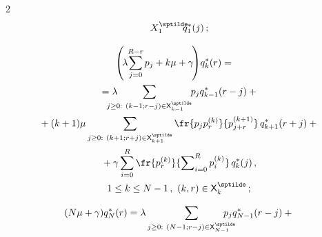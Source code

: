 \begin{multicols}{2}
\begin{equation}
{{X}_1^{\sptilde} }\hspace*{-2mm} q_1^*(j)\,;

  \label{e13-sop}

  \end{equation}

  

  \vspace*{-12pt}

  

  \noindent

  \begin{multline}

\!\!\!\! \! \left( \!\lambda\!\sum\limits_{j=0}^{R-r}\hspace*{-0.5pt} 

p_j+k\mu+\gamma\!\right) \!

q_k^*(r)={}\\

{}=\lambda \hspace*{-13pt}\sum\limits_{j\geq 0:\ (k-1;r-j)\in 

{\sf X}^{\sptilde}_{k-1}}

\hspace*{-3pt} p_j 

q^*_{k-1}(r-j)+{}\\

  {}+ (k+1)\mu \sum\limits_{j\geq0:\ (k+1;r+j)\in {\sf X}^{\sptilde}_{k+1}} \fr{p_j 

p_r^{(k)}}{p_{j+r}^{(k+1)}}\, q^*_{k+1}(r+j)+{}\\

  {}+\gamma \sum\limits^R_{i=0} \fr{p_r^{(k)}} {\sum\nolimits^R_{i=0} 

p_i^{(k)}}\,q_k^*(j)\,,\\

  1\leq k\leq N-1\,,\ (k,r)\in {\sf X}_k^{\sptilde}\,;

  \label{e14-sop}

  \end{multline}

  

  \vspace*{-12pt}

  

  \noindent

  \begin{multline}

  (N\mu+\gamma) q_N^*(r) =\lambda \sum\limits_{j\geq0:\ (N-1; r-j)\in {\sf 

X}_{N-1}^{\sptilde}} \hspace*{-5mm}p_j q^*_{N-1}(r-j)+{}\\


\end{multline}
\end{multicols}
